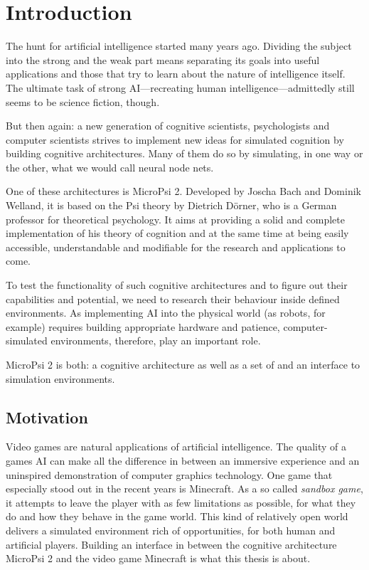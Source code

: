 \chapter{Introduction}
The hunt for artificial intelligence started many years ago. Dividing the subject into the strong and the weak part means separating its goals into useful applications and those that try to learn about the nature of intelligence itself. The ultimate task of strong AI---recreating human intelligence---admittedly still seems to be science fiction, though.

But then again: a new generation of cognitive scientists, psychologists and computer scientists strives to implement new ideas for simulated cognition by building cognitive architectures. Many of them do so by simulating, in one way or the other, what we would call neural node nets.

One of these architectures is MicroPsi 2. Developed by Joscha Bach and Dominik Welland, it is based on the Psi theory by Dietrich Dörner, who is a German professor for theoretical psychology. It aims at providing a solid and complete implementation of his theory of cognition and at the same time at being easily accessible, understandable and modifiable for the research and applications to come.

To test the functionality of such cognitive architectures and to figure out their capabilities and potential, we need to research their behaviour inside defined environments. As implementing AI into the physical world (as robots, for example) requires building appropriate hardware and patience, computer-simulated environments, therefore, play an important role.

MicroPsi 2 is both: a cognitive architecture as well as a set of and an interface to simulation environments.

\section{Motivation}
Video games are natural applications of artificial intelligence. The quality of a games AI can make all the difference in between an immersive experience and an uninspired demonstration of computer graphics technology. One game that especially stood out in the recent years is Minecraft. As a so called \emph{sandbox game}, it attempts to leave the player with as few limitations as possible, for what they do and how they behave in the game world. This kind of relatively open world delivers a simulated environment rich of opportunities, for both human and artificial players. Building an interface in between the cognitive architecture MicroPsi 2 and the video game Minecraft is what this thesis is about.


